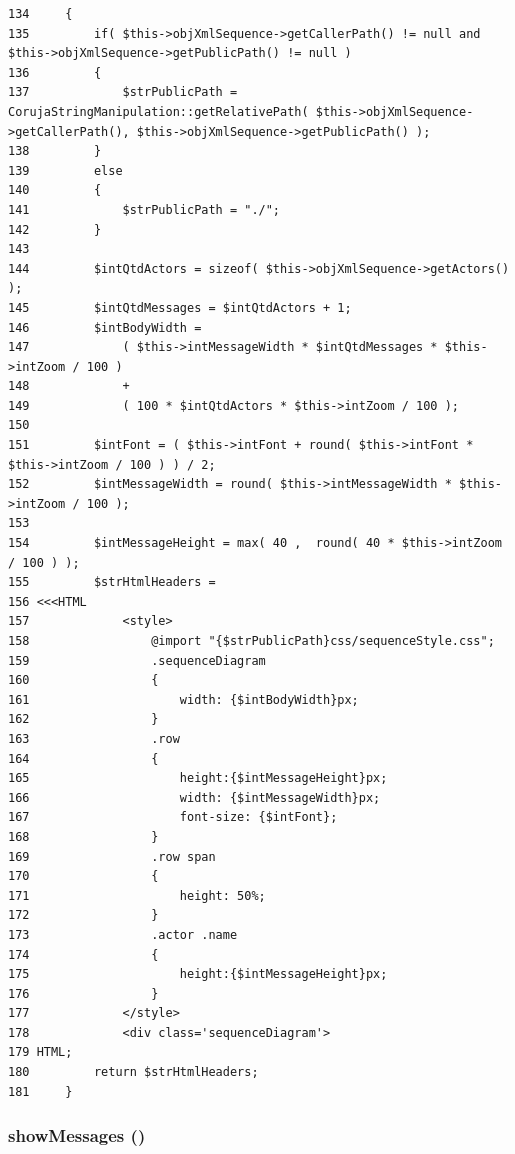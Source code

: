 \begin{Code}\begin{verbatim}134     {
135         if( $this->objXmlSequence->getCallerPath() != null and $this->objXmlSequence->getPublicPath() != null )
136         {
137             $strPublicPath = CorujaStringManipulation::getRelativePath( $this->objXmlSequence->getCallerPath(), $this->objXmlSequence->getPublicPath() );
138         }
139         else
140         {
141             $strPublicPath = "./";
142         }
143 
144         $intQtdActors = sizeof( $this->objXmlSequence->getActors() );
145         $intQtdMessages = $intQtdActors + 1;
146         $intBodyWidth =
147             ( $this->intMessageWidth * $intQtdMessages * $this->intZoom / 100 )
148             +
149             ( 100 * $intQtdActors * $this->intZoom / 100 );
150 
151         $intFont = ( $this->intFont + round( $this->intFont * $this->intZoom / 100 ) ) / 2;
152         $intMessageWidth = round( $this->intMessageWidth * $this->intZoom / 100 );
153 
154         $intMessageHeight = max( 40 ,  round( 40 * $this->intZoom / 100 ) );
155         $strHtmlHeaders =
156 <<<HTML
157             <style>
158                 @import "{$strPublicPath}css/sequenceStyle.css";
159                 .sequenceDiagram
160                 {
161                     width: {$intBodyWidth}px;
162                 }
163                 .row
164                 {
165                     height:{$intMessageHeight}px;
166                     width: {$intMessageWidth}px;
167                     font-size: {$intFont};
168                 }
169                 .row span
170                 {
171                     height: 50%;
172                 }
173                 .actor .name
174                 {
175                     height:{$intMessageHeight}px;
176                 }
177             </style>
178             <div class='sequenceDiagram'>
179 HTML;
180         return $strHtmlHeaders;
181     }
\end{verbatim}
\end{Code}


\hypertarget{class_xml_sequence_printer_diagram_814ab9f67831bd1af317490a9dfaa08a}{
\subsubsection[{showMessages}]{\setlength{\rightskip}{0pt plus 5cm}showMessages ()}}
\label{class_xml_sequence_printer_diagram_814ab9f67831bd1af317490a9dfaa08a}


